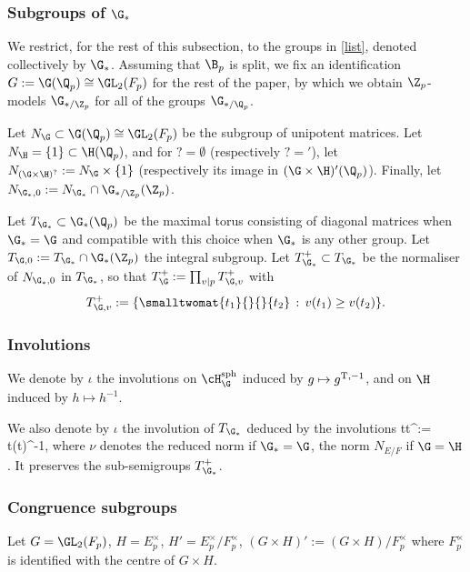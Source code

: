  \subsubsection{Subgroups of $\G_{*}$} We restrict,  for the rest of this subsection,  to the groups in \eqref{list}, denoted collectively by $\G_{*}$.
Assuming that $\B_{p}$ is split, we fix an  identification $G:=\G(\Q_{p})\cong \GL_{2}(F_{p})$ for the rest of the paper, by which we obtain  $\Z_{p}$-models $\G_{*/\Z_{p}}$ for all of the groups $\G_{*/\Q_{p}}$.


 Let $N_{\G}\subset \G(\Q_{p})\cong \GL_{2}(F_{p})$ be the subgroup of unipotent matrices. Let $N_{\H}=\{ 1\}\subset \H(\Q_{p})$, and for  $?=\emptyset$ (respectively $?= {}'$), let $N_{(\G\times \H)^{?}}:=N_{\G}\times \{1\}$ (respectively its image in $(\G\times\H)'(\Q_{p})$). Finally, let $N_{\G_{*},0}:= N_{\G_{*}}\cap \G_{*/\Z_{p}}(\Z_{p})$.


Let $T_{\G_{*}}\subset \G_{*}(\Q_{p})$ be the maximal torus consisting of diagonal matrices when $\G_{*}=\G$ and compatible with this choice when $\G_{*}$ is any other group. Let $T_{\G,0}:= T_{\G_{*}}\cap \G_{*}(\Z_{p})$ the integral subgroup.
Let    $T_{\G_{*}}^{+}\subset T_{\G_{*}}$
 be the normaliser of $N_{\G_{*}, 0}$ in $T_{\G_{*}}$, so that   $T_{\G}^{+}:=\prod_{v\vert p}T_{\G, v}^{+}$ with
 $$T_{\G, v}^{+}:=\{ \smalltwomat {t_{1}}{}{}{t_{2}} \, :\,  v(t_{1})\geq v(t_{2})\} .$$

\subsubsection{Involutions}  We denote by $\iota$ the involutions on
 $\cH^{\rm sph}_{\G}$ induced by $g\mapsto g^{\rm T,-1}$, and on $\H$ induced by $h\mapsto h^{-1}$.   %

We also denote by $\iota$ the involution of $T_{\G_{*}}$  deduced by the involutions
\beq
\label{involution}
t\mapsto t^{\iota}:= t\nu(t)^{-1},
\eeq
where  $\nu$ denotes the reduced norm if $\G_{*}=\G$, the norm $N_{E/F}$ if $\G=\H$.
It preserves the sub-semigroups  $T_{\G_{*}}^{+}$.











\subsubsection{Congruence subgroups}  
Let $G=\GL_{2}(F_{p})$, $H=E_{p}^{\times}$, $H'=E_{p}^{\times}/F_{p}^{\times}$,  $(G\times H)':=(G\times H)/F_{p}^{\times}$ where $F_{p}^{\times }$ is identified with the centre of $G\times H$.

